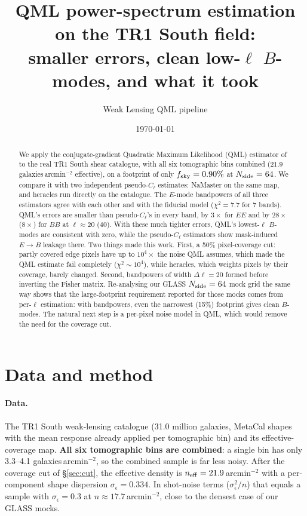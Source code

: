 \documentclass[11pt]{article}
\title{QML power-spectrum estimation on the TR1 South field:\\
smaller errors, clean low-$\ell$ $B$-modes, and what it took}
\author{Weak Lensing QML pipeline}
\date{\today}
\begin{document}
\maketitle

\begin{abstract}
We apply the conjugate-gradient Quadratic Maximum Likelihood (QML) estimator of \citet{Maraio2022} to the real
TR1 South shear catalogue, with all six tomographic bins combined (21.9 galaxies\,arcmin$^{-2}$ effective), on a
footprint of only $f_{\rm sky}=0.90\%$ at $N_{\rm side}=64$. We compare it with two independent pseudo-$C_\ell$
estimates: NaMaster on the same map, and heracles run directly on the catalogue. The $E$-mode bandpowers of all three
estimators agree with each other and with the fiducial model ($\chi^2=7.7$ for 7 bands). QML's errors are smaller
than pseudo-$C_\ell$'s in every band, by $3\times$ for $EE$ and by $28\times$ ($8\times$) for $BB$ at $\ell\approx20$
($40$). With these much tighter errors, QML's lowest-$\ell$ $B$-modes are consistent with zero, while the
pseudo-$C_\ell$ estimators show mask-induced $E\to B$ leakage there. Two things made this work. First, a 50\% pixel-coverage cut:
partly covered edge pixels have up to $10^4\times$ the noise QML assumes, which made the QML estimate fail completely
($\chi^2\sim10^4$), while heracles, which weights pixels by their coverage, barely changed. Second, bandpowers of width
$\Delta\ell=20$ formed before inverting the Fisher matrix. Re-analysing our GLASS $N_{\rm side}=64$ mock grid
the same way shows that the large-footprint requirement reported for those mocks comes from per-$\ell$ estimation:
with bandpowers, even the narrowest (15\%) footprint gives clean $B$-modes. The natural next step is a per-pixel noise
model in QML, which would remove the need for the coverage cut.
\end{abstract}

\tableofcontents

\section{Data and method}
\label{sec:method}

\paragraph{Data.} The TR1 South weak-lensing catalogue (31.0 million galaxies, MetaCal shapes with the mean response
already applied per tomographic bin) and its effective-coverage map. \textbf{All six tomographic bins are combined}:
a single bin has only 3.3--4.1 galaxies\,arcmin$^{-2}$, so the combined sample is far less noisy. After the coverage
cut of \S\ref{sec:cut}, the effective density is $n_{\rm eff}=21.9$\,arcmin$^{-2}$ with a per-component shape
dispersion $\sigma_\epsilon=0.334$. In shot-noise terms ($\sigma_\epsilon^2/n$) that equals a sample with
$\sigma_\epsilon=0.3$ at $n\approx17.7$\,arcmin$^{-2}$, close to the densest case of our GLASS mocks.
\end{document}
